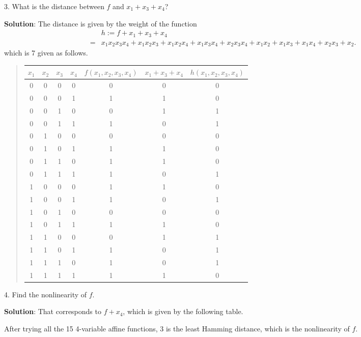 \documentclass[12pt]{article}
\theoremstyle{plain}
\begin{document}
3. What is the distance between $f$ and $x_1 + x_3 + x_4$?

{\bf Solution}: The distance is given by the weight of the function
$$\begin{aligned}
&h := f + x_1 + x_3 + x_4 \\
=& x_1x_2x_3x_4 + x_1x_2x_3 + x_1x_2x_4 + x_1x_3x_4 + x_2x_3x_4 + x_1x_2 
+ x_1x_3 + x_1x_4 + x_2x_3 + x_2.
\end{aligned}$$
which is 7 given as follows.

\begin{quote}
\begin{tabular}{c c c c| c || c || c }
$x_1$ & $x_2$ & $x_3$ & $x_4$ & $f(x_1, x_2, x_3, x_4)$ & $x_1+x_3+x_4$ & $h(x_1, x_2, x_3, x_4)$ \\
\hline
0 & 0 & 0 & 0 & 0 & 0 &	0\\
0 & 0 & 0 & 1 & 1 & 1 &	0\\
0 & 0 & 1 & 0 & 0 & 1 & 1\\
0 & 0 & 1 & 1 & 1 & 0	&	1\\
0 & 1 & 0 & 0 & 0 & 0	&	0\\
0 & 1 & 0 & 1 & 1 & 1	&	0\\
0 & 1 & 1 & 0 & 1 & 1	& 0\\
0 & 1 & 1 & 1 & 1 & 0	&	1\\
1 & 0 & 0 & 0 & 1 & 1	&	0\\
1 & 0 & 0 & 1 & 1 & 0	&	1\\
1 & 0 & 1 & 0 & 0 & 0	&	0\\
1 & 0 & 1 & 1 & 1 & 1	&	0\\
1 & 1 & 0 & 0 & 0 & 1	&	1\\
1 & 1 & 0 & 1 & 1 & 0	&	1\\
1 & 1 & 1 & 0 & 1 & 0	&	1\\
1 & 1 & 1 & 1 & 1 & 1	&	0\\
\end{tabular}
\end{quote}

4. Find the nonlinearity of $f$.

{\bf Solution}: That corresponds to $f + x_4$, which is given by the following table. 

After trying all the 15 4-variable affine functions, $3$ is the least Hamming distance, which is the nonlinearity of $f$.
\end{document}
